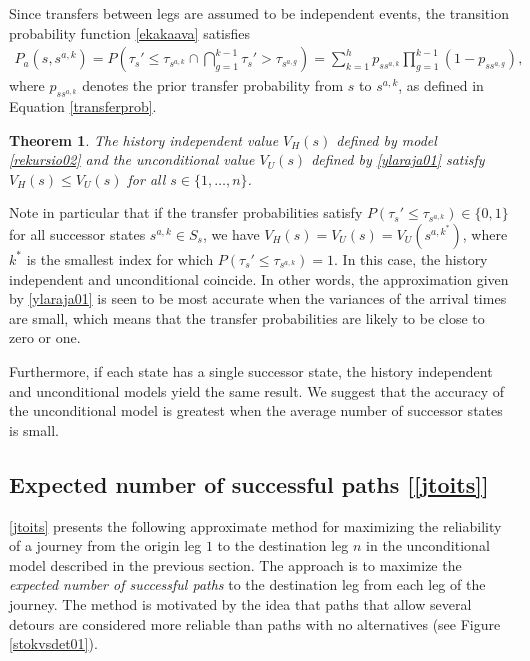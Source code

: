 \documentclass[dissertation,draft*]{aaltoseries}
\newtheorem{theorem}{Theorem}
\begin{document}
Since transfers between legs are assumed to be independent events, the transition probability function \eqref{ekakaava} satisfies
\begin{align}
\label{ylaraja01}
P_a(s,s^{a,k}) 
= 
P\left(\tau_{s}' \leq \tau_{s^{a,k}} \cap \bigcap_{g=1}^{k-1} \tau_{s}' > \tau_{s^{a,g}} \right)
= \sum_{k=1}^h p_{ss^{a,k}} \prod_{g = 1}^{k-1}(1-p_{ss^{a,g}}),
\end{align}
where $p_{ss^{a,k}}$ denotes the prior transfer probability from $s$ to $s^{a,k}$, as defined in Equation \eqref{transferprob}.

\begin{theorem}
The history independent value $V_H(s)$ defined by model \eqref{rekursio02} and the unconditional value $V_U(s)$ 
defined by \eqref{ylaraja01} satisfy $V_H(s) \leq V_U(s)$ for all $s \in \{1,\ldots,n\}$.
\end{theorem} 
Note in particular that if the transfer probabilities satisfy $P(\tau_{s}' \leq \tau_{s^{a,k}}) \in \{0,1\}$
for all successor states $s^{a,k} \in S_{s}$, we have $V_H(s) = V_U(s) = V_U(s^{a,k^*})$, where $k^*$ is the smallest index 
for which $P(\tau_{s}' \leq \tau_{s^{a,k}}) = 1$. In this case, the history independent and unconditional
coincide. In other words, the approximation given by \eqref{ylaraja01} is seen to be most accurate when 
the variances of the arrival times are small, which means that the transfer probabilities are likely
to be close to zero or one. 

Furthermore, if each state has a single successor state, the history independent and unconditional models yield the same result.
We suggest that the accuracy of the unconditional model is greatest when the average number of successor states is small.

\subsection{Expected number of successful paths [\ref{jtoits}]}
\label{enumber}
\ref{jtoits} presents the following approximate method for maximizing the reliability
of a journey from
the origin leg $1$ to the destination leg $n$ in the unconditional model described in the previous
section. The approach is to maximize the \emph{expected number 
of successful paths} to the destination leg from each leg of the journey. 
The method is motivated by the idea that paths that allow several detours are considered
more reliable than paths with no alternatives (see Figure \ref{stokvsdet01}).
\end{document}
